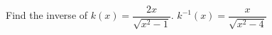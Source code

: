 {Find the inverse of $k(x) = \dfrac{2x}{\sqrt{x^{2} - 1}}$.}
{$k^{-1}(x) = \dfrac{x}{\sqrt{x^{2} - 4}}$}
